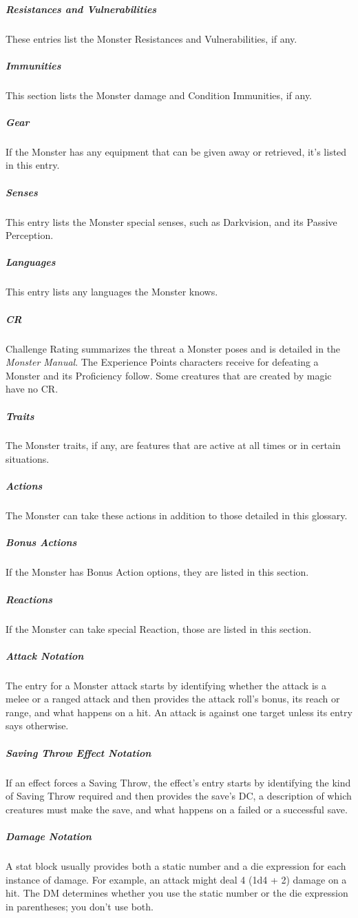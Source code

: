 \documentclass[10pt,a4paper,twoside,bg=print,twocolumn,openany,nodeprecatedcode]{dndarticle}
\begin{document}
\subparagraph{Resistances and Vulnerabilities}
These entries list the Monster Resistances and Vulnerabilities, if any.

\subparagraph{Immunities}
This section lists the Monster damage and Condition Immunities, if any.

\subparagraph{Gear}
If the Monster has any equipment that can be given away or retrieved, it's listed in this entry.

\subparagraph{Senses}
This entry lists the Monster special senses, such as Darkvision, and its Passive Perception.

\subparagraph{Languages}
This entry lists any languages the Monster knows.

\subparagraph{CR}
Challenge Rating summarizes the threat a Monster poses and is detailed in the \textit{Monster Manual}. The Experience Points characters receive for defeating a Monster and its Proficiency follow. Some creatures that are created by magic have no CR.

\subparagraph{Traits}
The Monster traits, if any, are features that are active at all times or in certain situations.

\subparagraph{Actions}
The Monster can take these actions in addition to those detailed in this glossary.

\subparagraph{Bonus Actions}
If the Monster has Bonus Action options, they are listed in this section.

\subparagraph{Reactions}
If the Monster can take special Reaction, those are listed in this section.

\subparagraph{Attack Notation}
The entry for a Monster attack starts by identifying whether the attack is a melee or a ranged attack and then provides the attack roll's bonus, its reach or range, and what happens on a hit. An attack is against one target unless its entry says otherwise.

\subparagraph{Saving Throw Effect Notation}
If an effect forces a Saving Throw, the effect's entry starts by identifying the kind of Saving Throw required and then provides the save's DC, a description of which creatures must make the save, and what happens on a failed or a successful save.

\subparagraph{Damage Notation}
A stat block usually provides both a static number and a die expression for each instance of damage. For example, an attack might deal 4 (1d4 + 2) damage on a hit. The DM determines whether you use the static number or the die expression in parentheses; you don't use both.
\end{document}
